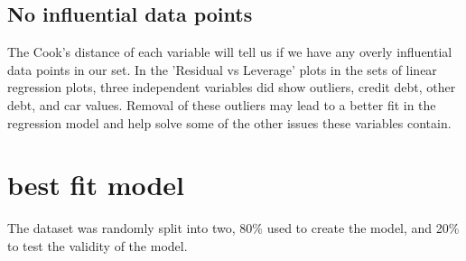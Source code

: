 \documentclass[journal]{IEEEtran}
\begin{document}
\subsection{No influential data points}
The Cook's distance\cite{cooks_distance} of each variable will tell us if we have any overly influential data points in our set. In the 'Residual vs Leverage' plots in the sets of linear regression plots, three independent variables did show outliers, credit debt, other debt, and car values. Removal of these outliers may lead to a better fit in the regression model and help solve some of the other issues these variables contain.
\section{best fit model}
\indent 
The dataset was randomly split into two, 80\% used to create the model, and 20\% to test the validity of the model. 
\end{document}
